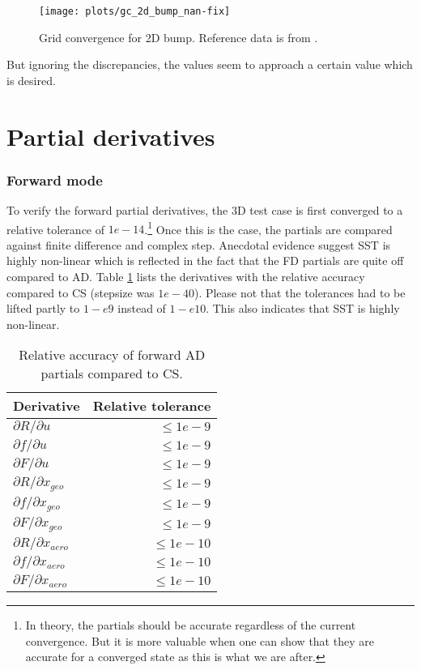 \begin{figure}[H] \centering
    \texttt{[image: plots/gc\_2d\_bump\_nan-fix]}
    \caption{Grid convergence for 2D bump. Reference data is from
    \cite{nasatmr}.}
    \label{fig:gc_2d_bump}
\end{figure}

\noindent But ignoring the discrepancies, the values seem to approach a certain
value which is desired.








\section{Partial derivatives}
\subsubsection{Forward mode}
To verify the forward partial derivatives, the 3D test case is first converged
to a relative tolerance of $1e-14$.\footnote{In theory, the partials should be
accurate regardless of the current convergence. But it is more valuable when
one can show that they are accurate for a converged state as this is what we
are after. } Once this is the case, the partials are compared against finite
difference and complex step. Anecdotal evidence suggest SST is highly
non-linear which is reflected in the fact that the FD partials are quite off
compared to AD. Table \ref{tab:partials_forward} lists the derivatives with the
relative accuracy compared to CS (stepsize was $1e-40$). Please not that the
tolerances had to be lifted partly to $1-e9$ instead of $1-e10$. This also
indicates that SST is highly non-linear.

\begin{table}[H]
    \centering
    \begin{tabular}{l r}
        \toprule
        Derivative                          & Relative tolerance \\
        \toprule
        $\partial R / \partial u$           & $\leq 1e-9$ \\
        $\partial f / \partial u$           & $\leq 1e-9$ \\
        $\partial F / \partial u$           & $\leq 1e-9$ \\
        \midrule
        $\partial R / \partial x_{geo}$     & $\leq 1e-9$ \\
        $\partial f / \partial x_{geo}$     & $\leq 1e-9$ \\
        $\partial F / \partial x_{geo}$     & $\leq 1e-9$ \\
        \midrule
        $\partial R / \partial x_{aero}$    & $\leq 1e-10$ \\
        $\partial f / \partial x_{aero}$    & $\leq 1e-10$ \\
        $\partial F / \partial x_{aero}$    & $\leq 1e-10$ \\
        \bottomrule
    \end{tabular}
    \caption{Relative accuracy of forward AD partials compared to CS.}
    \label{tab:partials_forward}
\end{table}


